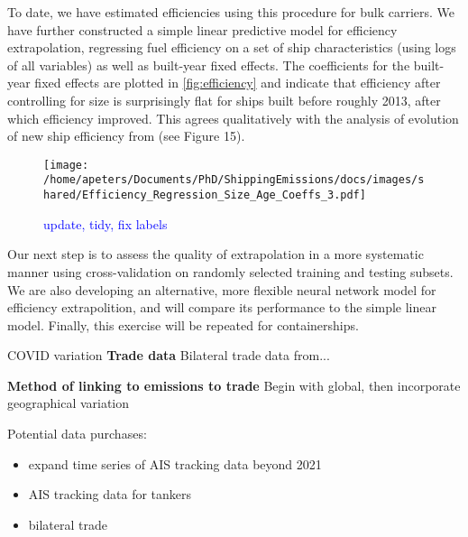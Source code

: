 \documentclass[hidelinks, 12pt,letterpaper]{article}
\begin{document}
To date, we have estimated efficiencies using this procedure for bulk carriers. We have further constructed a simple linear predictive model for efficiency extrapolation, regressing fuel efficiency on a set of ship characteristics (using logs of all variables) as well as built-year fixed effects. 
The coefficients for the built-year fixed effects are plotted in \autoref{fig:efficiency} and indicate that efficiency after controlling for size is surprisingly flat for ships built before roughly 2013, after which efficiency improved. This agrees qualitatively with the analysis of evolution of new ship efficiency from \citet{faber2015historical} (see Figure 15).

\begin{figure}[h]
  \centering
  \texttt{[image: /home/apeters/Documents/PhD/ShippingEmissions/docs/images/shared/Efficiency\_Regression\_Size\_Age\_Coeffs\_3.pdf]}
  \caption{\textcolor{blue}{update, tidy, fix labels}}
  \label{fig:efficiency}
\end{figure}

Our next step is to assess the quality of extrapolation in a more systematic manner using cross-validation on randomly selected training and testing subsets. We are also developing an alternative, more flexible neural network model for efficiency extrapolition, and will compare its performance to the simple linear model. Finally, this exercise will be repeated for containerships.

COVID variation
\textbf{Trade data} Bilateral trade data from...

\textbf{Method of linking to emissions to trade}
Begin with global, then incorporate geographical variation


\pagebreak
Potential data purchases:
\begin{itemize}
  \item expand time series of AIS tracking data beyond 2021
  \item AIS tracking data for tankers
  \item bilateral trade
\end{itemize}

\pagebreak
  
\singlespace{

}

 
\end{document}
